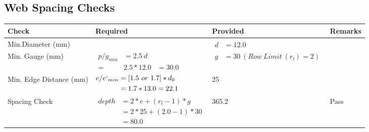 \documentclass{article}%
\begin{document}
\subsection{Web Spacing Checks}%
\label{subsec:WebSpacingChecks}%
\renewcommand{\arraystretch}{1.2}%
\begin{longtable}{|p{2.5cm}|p{7.5cm}|p{5cm}|p{1cm}|}%
\hline%
\rowcolor{OsdagGreen}%
Check&Required&Provided&Remarks\\%
\hline%
\endhead%
\hline%
Min.Diameter (mm)&&$\begin{aligned} d &=12.0\end{aligned}$&\\%
\hline%
Min. Gauge (mm)&$\begin{aligned}p/g_{min}&= 2.5 ~ d&\\ =&2.5*12.0&=30.0\end{aligned}$&$\begin{aligned} g &=30~(Row~Limit~(r_l) = 2)\end{aligned}$&\\%
\hline%
Min. Edge Distance (mm)&$\begin{aligned}e/e`_{min} &=[1.5~or~ 1.7] * d_0\\ &=1.7*13.0=22.1 \end{aligned}$&25&\\%
\hline%
Spacing Check&$\begin{aligned} depth & = 2 * e + (r_l -1) * g\\ & = 2 * 25+(2.0-1)*30\\ & = 80.0\end{aligned}$&365.2&Pass\\%
\hline%
\end{longtable}

%
\newpage%
\end{document}
